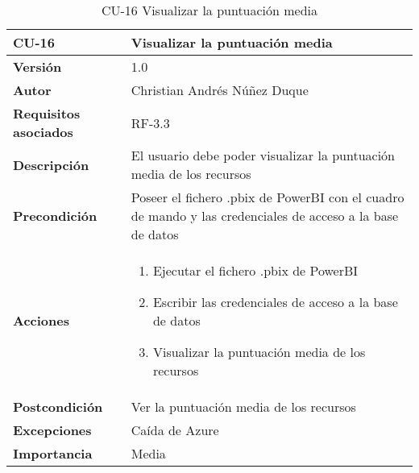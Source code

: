 \begin{table}[p]
	\centering
	\begin{tabularx}{\linewidth}{ p{} p{} }
		\toprule
		\textbf{CU-16}    & \textbf{Visualizar la puntuación media}\\
		\toprule
		\textbf{Versión}              & 1.0    \\
		\textbf{Autor}                & Christian Andrés Núñez Duque \\
		\textbf{Requisitos asociados} & RF-3.3 \\
		\textbf{Descripción}          & El usuario debe poder visualizar la puntuación media de los recursos \\
		\textbf{Precondición}         & Poseer el fichero .pbix de PowerBI con el cuadro de mando y las credenciales de acceso a la base de datos \\
		\textbf{Acciones}             &
		\begin{enumerate}
			\def\labelenumi{\arabic{enumi}.}
			\tightlist
			\item Ejecutar el fichero .pbix de PowerBI
			\item Escribir las credenciales de acceso a la base de datos
			\item Visualizar la puntuación media de los recursos
		\end{enumerate}\\
		\textbf{Postcondición}        & Ver la puntuación media de los recursos \\
		\textbf{Excepciones}          & Caída de Azure \\
		\textbf{Importancia}          & Media \\
		\bottomrule
	\end{tabularx}
	\caption{CU-16 Visualizar la puntuación media}
\end{table}

